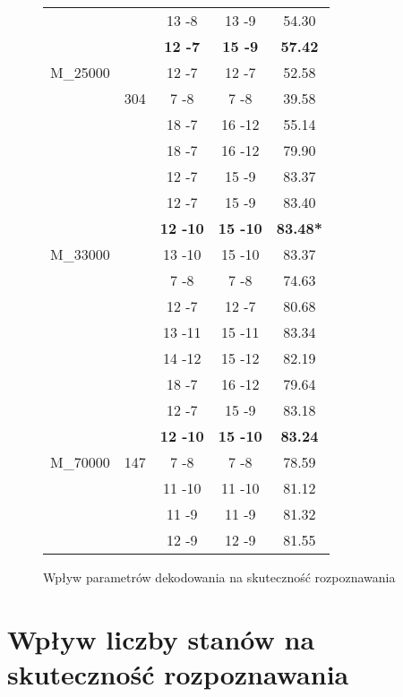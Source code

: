\documentclass[shortabstract, mgr]{iithesis}
\begin{document}
\begin{figure}
\begin{tabular}{|c|c|c|c|c|}
					\multirow{5}{*}{M\_25000} &	
					\multirow{7}{*}{304}            &	  
					13 -8 & 13 -9 & 54.30 \\
					&& \textbf{12 -7} & \textbf{15 -9} & \textbf{57.42} \\
					&& 12 -7 & 12 -7 & 52.58 \\
					&& 7 -8  & 7 -8  & 39.58 \\
					&& 18 -7 & 16 -12& 55.14 \\
					\hline
					\multirow{9}{*}{M\_33000} &
					\multirow{7}{*}{231}            &
					18 -7 & 16 -12 & 79.90 \\
					&& 12 -7 & 15 -9  & 83.37 \\
					&& 12 -7 & 15 -9  & 83.40 \\
					&& \textbf{12 -10}& \textbf{15 -10} & \textbf{83.48*} \\
					&& 13 -10& 15 -10 & 83.37 \\
					&& 7 -8  & 7 -8   & 74.63 \\
					&& 12 -7 & 12 -7  & 80.68 \\
					&& 13 -11& 15 -11 & 83.34 \\
					&& 14 -12& 15 -12 & 82.19 \\
					\hline
					\multirow{7}{*}{M\_70000} &
					\multirow{7}{*}{147}            &
					18 -7 & 16 -12 & 79.64 \\
					&& 12 -7 & 15 -9  & 83.18 \\
					&& \textbf{12 -10}& \textbf{15 -10} & \textbf{83.24} \\
					&& 7 -8  & 7 -8   & 78.59 \\
					&& 11 -10& 11 -10 &  81.12 \\
					&& 11 -9 & 11 -9  &  81.32 \\
					&& 12 -9 & 12 -9  &  81.55 \\
					\hline					
					
				\end{tabular}
			\label{tab:metadata_impact}
			\caption{Wpływ parametrów dekodowania na skuteczność rozpoznawania }
		\end{figure}
		
	\section{Wpływ liczby stanów na skuteczność rozpoznawania }
		\label{sec:q-num_impact}
	
\end{document}

